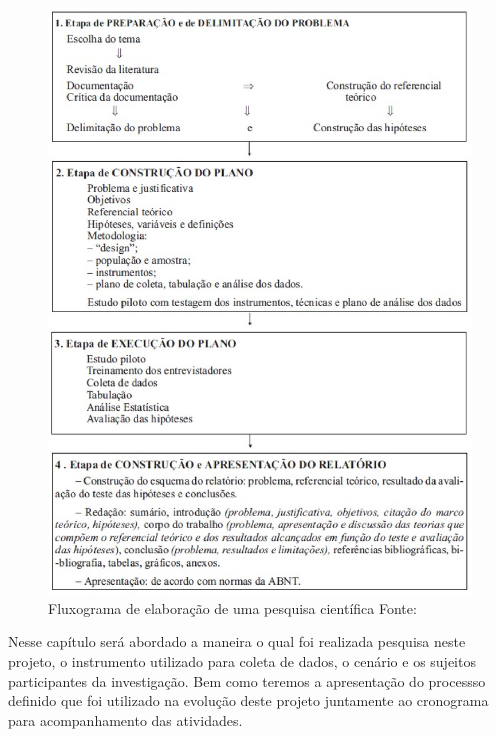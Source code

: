     \begin{figure}[ht!]
        \centering
            \includegraphics[keepaspectratio=true,scale=0.75]
                                      {figuras/figura18.eps}
                \caption[Fluxograma de elaboração de uma pesquisa científica]{Fluxograma de elaboração de uma pesquisa científica
                \protect\linebreak Fonte: }
                \label{figura18}
    \end{figure}

    Nesse capítulo será abordado a maneira o qual foi realizada pesquisa neste projeto, o instrumento utilizado para coleta
    de dados, o cenário e os sujeitos participantes da investigação. Bem como teremos a apresentação do processso
    definido que foi utilizado na evolução deste projeto juntamente ao cronograma para acompanhamento das atividades.

